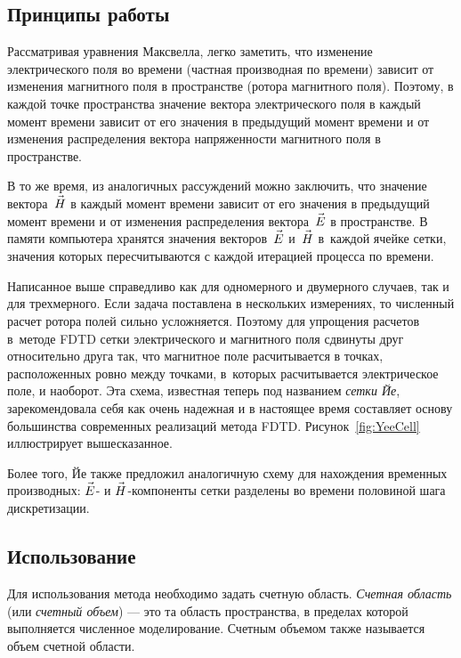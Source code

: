 \subsection{Принципы работы}

Рассматривая уравнения Максвелла, легко заметить, что изменение электрического
поля во времени (частная производная по времени) зависит от изменения магнитного
поля в пространстве (ротора магнитного поля). Поэтому, в каждой точке
пространства значение вектора электрического поля в каждый момент времени
зависит от его значения в предыдущий момент времени и от изменения распределения
вектора напряженности магнитного поля в пространстве.

В то же время, из аналогичных рассуждений можно заключить, что значение
вектора~$\vec{H\mathstrut}$ в каждый момент времени зависит от его значения в предыдущий
момент времени и от изменения распределения вектора~$\vec{E\mathstrut}$ в пространстве.
В памяти компьютера хранятся значения векторов~$\vec{E\mathstrut}$ и~$\vec{H\mathstrut}$
в~каждой ячейке сетки, значения которых пересчитываются с каждой итерацией процесса по времени.

Написанное выше справедливо как для одномерного и двумерного случаев, так и для
трехмерного. Если задача поставлена в нескольких измерениях, то численный
расчет ротора полей сильно усложняется. Поэтому для упрощения расчетов в~методе
FDTD сетки электрического и магнитного поля сдвинуты друг относительно друга
так, что магнитное поле расчитывается в точках, расположенных ровно между
точками, в~которых расчитывается электрическое поле, и наоборот. Эта схема,
известная теперь под названием \emph{сетки Йе}, зарекомендовала себя как очень
надежная и в настоящее время составляет основу большинства современных
реализаций метода FDTD. Рисунок~\ref{fig:YeeCell} иллюстрирует вышесказанное.

Более того, Йе также предложил аналогичную схему для нахождения временных
производных: $\vec{E\mathstrut}$- и $\vec{H\mathstrut}$-компоненты сетки разделены во времени
половиной шага дискретизации.


\subsection{Использование}

Для использования метода необходимо задать счетную область.
\emph{Счетная область} (или \emph{счетный объем}) --- это та область
пространства, в пределах которой выполняется численное моделирование.
Счетным объемом также называется объем счетной области.

